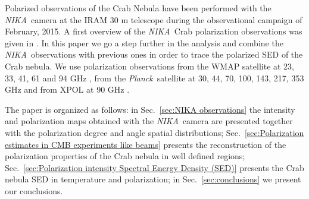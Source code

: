 \documentclass[twocolumn,traditabstract]{aa}
\def\NIKA{\textit{NIKA}}
\def\Planck{\textit{Planck}}
\begin{document}
Polarized observations of the Crab Nebula have been performed with the
\NIKA\ camera \citep{monfardini2010,catalano2014,monfardini2014} at the IRAM 30
m telescope during the observational campaign of February, 2015. A first
overview of the \NIKA\ Crab polarization observations was given in
\cite{2016JLTP..184..724R}. In this paper we go a step further in the analysis
and combine the \NIKA\ observations with previous ones in order to trace the
polarized SED of the Crab nebula. We use polarization observations from the WMAP
satellite at 23, 33, 41, 61 and 94 GHz \citep{2011ApJS..192...19W}, from the
\Planck\ satellite at 30, 44, 70, 100, 143, 217, 353 GHz and from XPOL at 90 GHz
\citep{aumont2010}.

The paper is organized as follows: in Sec.~\ref{sec:NIKA observations} the
intensity and polarization maps obtained with the \NIKA\ camera are presented
together with the polarization degree and angle spatial distributions;
Sec.~\ref{sec:Polarization estimates in CMB experiments like beams} presents the
reconstruction of the polarization properties of the Crab nebula in well defined
regions; Sec.~\ref{sec:Polarization intensity Spectral Energy Density (SED)}
presents the Crab nebula SED in temperature and polarization; in
Sec.~\ref{sec:conclusions} we present our conclusions.
\end{document}
